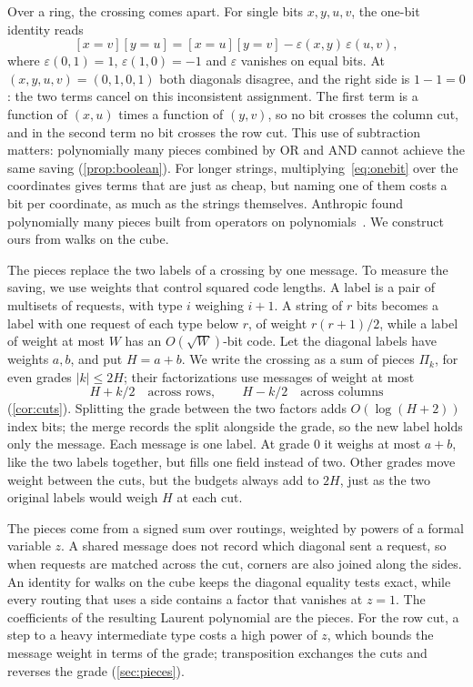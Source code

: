 \documentclass[11pt]{article}
\theoremstyle{definition}
\theoremstyle{definition}
\theoremstyle{remark}
\begin{document}
Over a ring, the crossing comes apart. For single bits $x,y,u,v$, the one-bit identity reads
\begin{equation}\label{eq:onebit}
[x=v][y=u]=[x=u][y=v]-\varepsilon(x,y)\,\varepsilon(u,v),
\end{equation}
where $\varepsilon(0,1)=1$, $\varepsilon(1,0)=-1$ and $\varepsilon$ vanishes on equal bits. At $(x,y,u,v)=(0,1,0,1)$ both diagonals disagree, and the right side is $1-1=0$: the two terms cancel on this inconsistent assignment. The first term is a function of $(x,u)$ times a function of $(y,v)$, so no bit crosses the column cut, and in the second term no bit crosses the row cut. This use of subtraction matters: polynomially many pieces combined by OR and AND cannot achieve the same saving (\cref{prop:boolean}). For longer strings, multiplying~\eqref{eq:onebit} over the coordinates gives terms that are just as cheap, but naming one of them costs a bit per coordinate, as much as the strings themselves. Anthropic found polynomially many pieces built from operators on polynomials~\cite[Appendix~B]{Ant26}. We construct ours from walks on the cube.

The pieces replace the two labels of a crossing by one message. To measure the saving, we use weights that control squared code lengths. A label is a pair of multisets of requests, with type $i$ weighing $i+1$. A string of $r$ bits becomes a label with one request of each type below $r$, of weight $r(r+1)/2$, while a label of weight at most $W$ has an $O(\sqrt W)$-bit code. Let the diagonal labels have weights $a,b$, and put $H=a+b$. We write the crossing as a sum of pieces $\Pi_k$, for even grades $|k|\le2H$; their factorizations use messages of weight at most
\[
H+k/2\quad\text{across rows},\qquad H-k/2\quad\text{across columns}
\]
(\cref{cor:cuts}). Splitting the grade between the two factors adds $O(\log(H+2))$ index bits; the merge records the split alongside the grade, so the new label holds only the message. Each message is one label. At grade $0$ it weighs at most $a+b$, like the two labels together, but fills one field instead of two. Other grades move weight between the cuts, but the budgets always add to $2H$, just as the two original labels would weigh $H$ at each cut.

The pieces come from a signed sum over routings, weighted by powers of a formal variable $z$. A shared message does not record which diagonal sent a request, so when requests are matched across the cut, corners are also joined along the sides. An identity for walks on the cube keeps the diagonal equality tests exact, while every routing that uses a side contains a factor that vanishes at $z=1$. The coefficients of the resulting Laurent polynomial are the pieces. For the row cut, a step to a heavy intermediate type costs a high power of $z$, which bounds the message weight in terms of the grade; transposition exchanges the cuts and reverses the grade (\cref{sec:pieces}).
\end{document}
